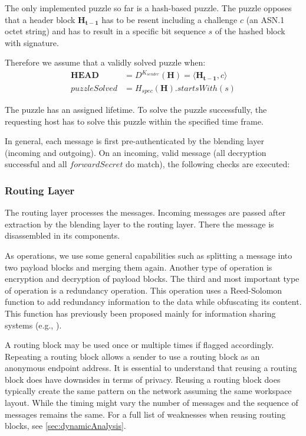 \documentclass[10pt,journal,compsoc,twocolumn,twoside]{IEEEtran}
\begin{document}
The only implemented puzzle so far is a hash-based puzzle. The puzzle opposes that a header block $\mathbf{H_{t-1}}$ has to be resent including a challenge $c$ (an ASN.1 octet string) and has to result in a specific bit sequence $s$ of the hashed block with signature.

Therefore we assume that a validly solved puzzle when:
\begin{eqnarray}
\mathbf{HEAD}&= D^{K_{sender}}\left(\mathbf{H}\right) = \langle \mathbf{H_{t-1}}, c\rangle\\
puzzleSolved&= H_{spec}(\mathbf{H}).startsWith(s)
\end{eqnarray}

The puzzle has an assigned lifetime. To solve the puzzle successfully, the requesting host has to solve this puzzle within the specified time frame. 

In general, each message is first pre-authenticated by the blending layer (incoming and outgoing). On an incoming, valid message (all decryption successful and all $forwardSecret$ do match), the following checks are executed:



\subsubsection{Routing Layer}
The routing layer processes the messages. Incoming messages are passed after extraction by the blending layer to the routing layer. There the message is disassembled in its components.

As operations, we use some general capabilities such as splitting a message into two payload blocks and merging them again. Another type of operation is encryption and decryption of payload blocks. The third and most important type of operation is a redundancy operation. This operation uses a Reed-Solomon\cite{reed1960polynomial} function to add redundancy information to the data while obfuscating its content. This function has previously been proposed mainly for information sharing systems (e.g., \cite{mceliece1981sharing}).

A routing block may be used once or multiple times if flagged accordingly. Repeating a routing block allows a sender to use a routing block as an anonymous endpoint address. It is essential to understand that reusing a routing block does have downsides in terms of privacy. Reusing a routing block does typically create the same pattern on the network assuming the same workspace layout. While the timing might vary the number of messages and the sequence of messages remains the same. For a full list of weaknesses when reusing routing blocks, see \ref{sec:dynamicAnalysis}.
\end{document}
